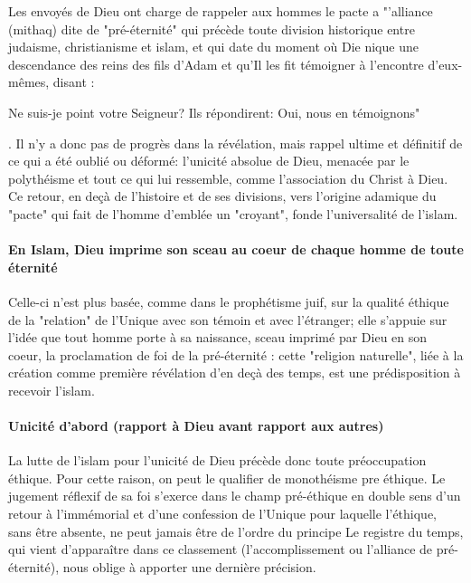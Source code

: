 Les envoyés de Dieu ont charge de rappeler aux hommes le pacte a "'alliance (mithaq) dite de "pré-éternité" qui précède toute division historique entre judaisme, christianisme et islam, et qui date du moment où Die nique une descendance des reins des fils d'Adam et qu'Il les fit témoigner à l’encontre d'eux-mêmes, disant : \begin{Ecriture}[sourate 7, 172]
    Ne suis-je point votre Seigneur? Ils répondirent: Oui, nous en témoignons"
\end{Ecriture} . Il n'y a donc pas de progrès dans la révélation, mais rappel ultime et définitif de ce qui a été oublié ou déformé: l'unicité absolue de Dieu, menacée par le polythéisme et tout ce qui lui ressemble, comme l'association du Christ à Dieu. Ce retour, en deçà de l'histoire et de ses divisions, vers l'origine adamique du "pacte" qui fait de l'homme d'emblée un "croyant", fonde l'universalité de l'islam. \paragraph{En Islam, Dieu imprime son sceau au coeur de chaque homme de toute éternité}Celle-ci n’est plus basée, comme dans le prophétisme juif, sur la qualité éthique de la "relation" de l'Unique avec son témoin et avec l'étranger; elle s'appuie sur l'idée que tout homme porte à sa naissance, sceau imprimé par Dieu en son coeur, la proclamation de foi de la pré-éternité : cette "religion naturelle", liée à la création comme première révélation d'en deçà des temps, est une prédisposition à recevoir l'islam.
\paragraph{Unicité d'abord (rapport à Dieu avant rapport aux autres)}
La lutte de l'islam pour l'unicité de Dieu précède donc toute préoccupation éthique. Pour cette raison, on peut le qualifier de monothéisme pre éthique. Le jugement réflexif de sa foi s'exerce dans le champ pré-éthique en double sens d'un retour à l'immémorial et d'une confession de l'Unique pour laquelle l'éthique, sans être absente, ne peut jamais être de l'ordre du principe Le registre du temps, qui vient d'apparaître dans ce classement (l'accomplissement ou l'alliance de pré-éternité), nous oblige à apporter une dernière précision. 

